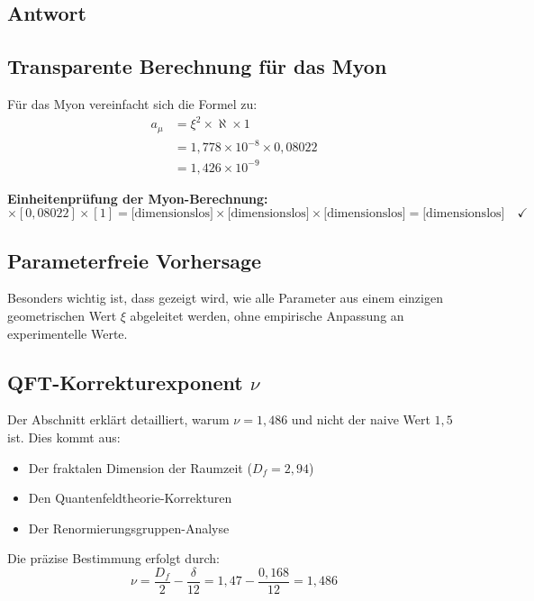 \documentclass[12pt,a4paper]{article}
\newcommand{\nulep}{\nu}
\theoremstyle{remark}
\newenvironment{answer}{\subsection*{Antwort}}{\vspace{1em}}
\begin{document}
\begin{answer}
	\subsection{Transparente Berechnung für das Myon}
	
	Für das Myon vereinfacht sich die Formel zu:
	\begin{align}
		a_\mu &= \xi^2 \times \aleph \times 1 \\
		&= 1{,}778 \times 10^{-8} \times 0{,}08022 \\
		&= 1{,}426 \times 10^{-9}
	\end{align}
	
	\begin{units}
		\textbf{Einheitenprüfung der Myon-Berechnung:}
		\begin{equation}
			[1{,}778 \times 10^{-8}] \times [0{,}08022] \times [1] = \text{[dimensionslos]} \times \text{[dimensionslos]} \times \text{[dimensionslos]} = \text{[dimensionslos]} \quad \checkmark
		\end{equation}
	\end{units}
	
	\subsection{Parameterfreie Vorhersage}
	
	Besonders wichtig ist, dass gezeigt wird, wie alle Parameter aus einem einzigen geometrischen Wert $\xi$ abgeleitet werden, ohne empirische Anpassung an experimentelle Werte.
	
	\subsection{QFT-Korrekturexponent $\nulep$}
	
	Der Abschnitt erklärt detailliert, warum $\nulep = 1{,}486$ und nicht der naive Wert $1{,}5$ ist. Dies kommt aus:
	\begin{itemize}
		\item Der fraktalen Dimension der Raumzeit ($D_f = 2{,}94$)
		\item Den Quantenfeldtheorie-Korrekturen
		\item Der Renormierungsgruppen-Analyse
	\end{itemize}
	
	Die präzise Bestimmung erfolgt durch:
	\begin{equation}
		\nulep = \frac{D_f}{2} - \frac{\delta}{12} = 1{,}47 - \frac{0{,}168}{12} = 1{,}486
	\end{equation}
	

\end{answer}
\end{document}
